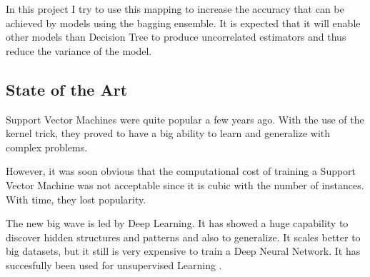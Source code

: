 \documentclass{article}
\begin{document}
    In this project I try to use this mapping to increase the accuracy that can
    be achieved by models using the bagging ensemble. It is expected that it will
    enable other models than Decision Tree to produce uncorrelated estimators and
    thus reduce the variance of the model.
    \subsection{State of the Art}

    Support Vector Machines \cite{vapnik_svm} were quite popular a few years ago. With the use of
    the kernel trick, they proved to have a big ability to learn and generalize
    with complex problems.

    However, it was soon
    obvious
    that the computational cost of training a
    Support Vector Machine was not acceptable since it is cubic with the
    number of instances. With time, they lost popularity.

    The new big wave is led by Deep Learning. It has showed a huge
    capability to discover hidden structures and patterns and also to generalize.
    It scales better to big datasets, but it still is very expensive to train
    a Deep Neural Network. It has succesfully been used for unsupervised
    Learning \cite{alphago16}.
\end{document}
